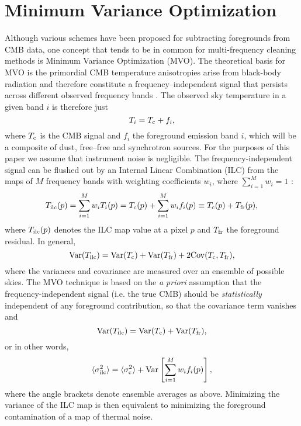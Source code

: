 \documentclass{emulateapj}
\def\cmb{{\rm c}}
\def\ilc{{\rm ilc}}
\def\f{{\rm fr}}
\begin{document}
\section{Minimum Variance Optimization}
Although various schemes have been proposed for subtracting
foregrounds from CMB data, one concept that tends to be in common
for multi-frequency cleaning methods is Minimum Variance
Optimization (MVO). The theoretical basis for MVO is the primordial
CMB temperature anisotropies arise from black-body radiation and
therefore constitute a frequency--independent signal that persists
across different observed frequency bands \citep{te96}. The observed sky
temperature in a given band $i$ is therefore just
\begin{equation}
T_i = T_\cmb + f_i,
\end{equation}
where $T_\cmb$ is the CMB signal and $f_i$ the foreground emission
band $i$, which will be a composite of dust, free--free and
synchrotron sources. For the purposes of this paper we assume that
instrument noise is negligible. The frequency-independent signal can
be flushed out by an Internal Linear Combination (ILC) from the maps
of $M$ frequency bands with weighting coefficients $w_i$, where
$\sum_{i=1}^M w_i=1$ \citep{wmapfg}:
\begin{equation}
T_\ilc(p)=\sum_{i=1}^M w_i T_i(p) = T_\cmb(p) + \sum_{i=1}^M w_i
f_i(p)\equiv T_\cmb(p)+T_\f(p), \label{minivar}
\end{equation}
where $T_\ilc(p)$ denotes the ILC map value at a pixel $p$ and $T_\f$ the foreground residual. In
general, 
\begin{equation} 
{\rm Var} (T_\ilc) = {\rm Var}(T_\cmb) + {\rm
Var}(T_\f) + 2 {\rm Cov} (T_\cmb, T_\f), \label{cov} 
\end{equation}
where the variances and covariance are measured over an ensemble of
possible skies. The MVO technique is based on the {\it a priori}
assumption that the frequency-independent signal (i.e. the true CMB)
should be {\it statistically} independent of any foreground
contribution, so that the covariance term vanishes and 
 \begin{equation}
{\rm Var} (T_\ilc) = {\rm Var}(T_\cmb) + {\rm Var}(T_\f),
\end{equation}
or in other words,
\begin{equation}
\langle \sigma_\ilc^2\rangle= \langle \sigma_\cmb^2 \rangle + {\rm
Var} \left[ \sum_{i=1}^M w_i f_i(p) \right], \label{si}
\end{equation}
where the angle brackets denote ensemble averages as above.
Minimizing the variance of the ILC map is then equivalent to
minimizing the foreground contamination of a map of thermal noise.
\end{document}
